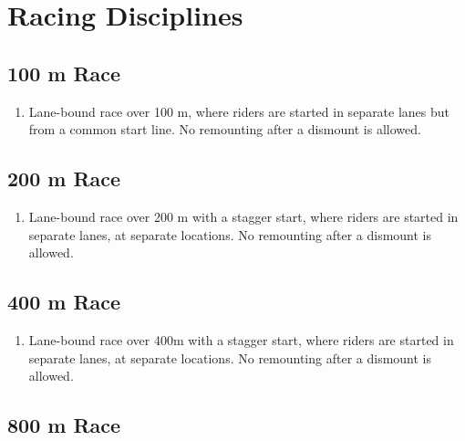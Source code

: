\section{Racing Disciplines}

\subsection{100 m Race}

\begin{enumerate}[leftmargin=1.5em,labelsep=*]
	\item Lane-bound race over 100 m, where riders are started in 
    separate lanes but from a common start line. No remounting after a dismount is allowed.
\end{enumerate}

\subsection{200 m Race}

\begin{enumerate}[leftmargin=1.5em,labelsep=*]
	\item Lane-bound race over 200 m with a stagger start, where riders are started in separate lanes, at separate locations.
	No remounting after a dismount is allowed.
\end{enumerate}

\subsection{400 m Race}

\begin{enumerate}[leftmargin=1.5em,labelsep=*]
	\item Lane-bound race over 400m with a stagger start, where riders are started in separate lanes, at separate locations.
	No remounting after a dismount is allowed.
\end{enumerate}

\subsection{800 m Race}

